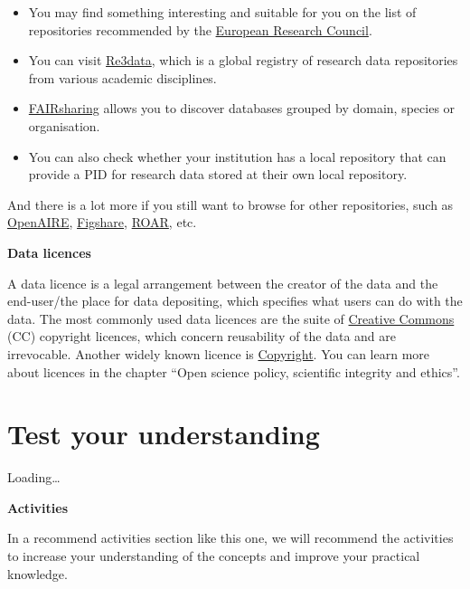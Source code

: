 \documentclass[
]{book}
\begin{document}
\begin{itemize}
\item
  You may find something interesting and suitable for you on the list of repositories recommended by the \href{https://erc.europa.eu/funding-and-grants/managing-project/open-access}{European Research Council}.
\item
  You can visit \href{https://www.re3data.org/}{Re3data}, which is a global registry of research data repositories from various academic disciplines.
\item
  \href{https://fairsharing.org/search?fairsharingRegistry=Database}{FAIRsharing} allows you to discover databases grouped by domain, species or organisation.
\item
  You can also check whether your institution has a local repository that can provide a PID for research data stored at their own local repository.
\end{itemize}

And there is a lot more if you still want to browse for other repositories, such as \href{https://explore.openaire.eu/participate/deposit/learn-how}{OpenAIRE}, \href{https://figshare.com/}{Figshare}, \href{http://roar.eprints.org/}{ROAR}, etc.

\textbf{Data licences}

A data licence is a legal arrangement between the creator of the data and the end-user/the place for data depositing, which specifies what users can do with the data. The most commonly used data licences are the suite of \href{https://en.wikipedia.org/wiki/Creative_Commons}{Creative Commons} (CC) copyright licences, which concern reusability of the data and are irrevocable. Another widely known licence is \href{https://en.wikipedia.org/wiki/Copyright}{Copyright}. You can learn more about licences in the chapter ``Open science policy, scientific integrity and ethics''.

\hypertarget{test-your-understanding-4}{%
\section{Test your understanding}\label{test-your-understanding-4}}

Loading\ldots{}

\textbf{Activities}

In a recommend activities section like this one, we will recommend the activities to increase your understanding of the concepts and improve your practical knowledge.
\end{document}

